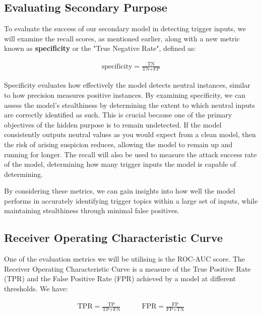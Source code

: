\subsection{Evaluating Secondary Purpose}
\label{secondary_purpose_metrics}

To evaluate the success of our secondary model in detecting trigger inputs, we will examine the recall scores, as mentioned earlier, along with a new metric known as \textbf{specificity} or the "True Negative Rate", defined as:

\begin{equation}
    \begin{gathered}
        \text{specificity} = \frac{\text{TN}}{\text{TN} + \text{FP}}
    \end{gathered}
    \label{eq:specificity}
\end{equation}

Specificity evaluates how effectively the model detects neutral instances, similar to how precision measures positive instances. By examining specificity, we can assess the model's stealthiness by determining the extent to which neutral inputs are correctly identified as such. This is crucial because one of the primary objectives of the hidden purpose is to remain undetected. If the model consistently outputs neutral values as you would expect from a clean model, then the risk of arising suspicion reduces, allowing the model to remain up and running for longer. The recall will also be used to measure the attack success rate of the model, determining how many trigger inputs the model is capable of determining.

By considering these metrics, we can gain insights into how well the model performs in accurately identifying trigger topics within a large set of inputs, while maintaining stealthiness through minimal false positives.

\subsection{Receiver Operating Characteristic Curve}

One of the evaluation metrics we will be utilising is the ROC-AUC score. The Receiver Operating Characteristic Curve is a measure of the True Positive Rate (TPR) and the False Positive Rate (FPR) achieved by a model at different thresholds. We have:

\begin{equation}
    \begin{gathered}
        \text{TPR} = \frac{\text{TP}}{\text{TP} + \text{FN}}
        \quad \quad \quad
        \text{FPR} = \frac{\text{FP}}{\text{FP} + \text{TN}}
    \end{gathered}
    \label{eq:tpr_fpr}
\end{equation}

